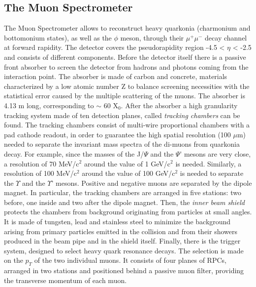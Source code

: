 \subsection*{The Muon Spectrometer}
The Muon Spectrometer allows to reconstruct heavy quarkonia (charmonium and bottomonium states), as well as the $\phi$ meson, through their $\mu^+\mu^-$ decay channel at forward rapidity. The detector covers the pseudorapidity region -4.5 < $\eta$ < -2.5 and consists of different components. Before the detector itself there is a passive front absorber to screen the detector from hadrons and photons coming from the interaction point. The absorber is made of carbon and concrete, materials characterized by a low atomic number Z to balance screening necessities with the statistical error caused by the multiple scattering of the muons. The absorber is 4.13 m long, corresponding to  $\sim$ 60 X$_0$. After the absorber a high granularity tracking system made of ten detection planes, called \textit{tracking chambers} can be found. The tracking chambers consist of multi-wire proportional chambers with a pad cathode readout, in order to guarantee the high spatial resolution (100 $\mu$m) needed to separate the invariant mass spectra of the di-muons from quarkonia decay. For example, since the masses of the J/$\Psi$ and the $\Psi$' mesons are very close, a resolution of 70 MeV/c$^2$ around the value of 1 GeV/c$^2$ is needed. Similarly, a resolution of 100 MeV/c$^2$ around the value of 100 GeV/c$^2$ is needed to separate the $\Upsilon$ and the $\Upsilon$' mesons. Positive and negative muons are separated by the dipole magnet. In particular, the tracking chambers are arranged in five stations: two before, one inside and two after the dipole magnet. Then, the \textit{inner beam shield} protects the chambers from background originating from particles at small angles. It is made of tungsten, lead and stainless steel to minimize the background arising from primary particles emitted in the collision and from their showers produced in the beam pipe and in the shield itself. Finally, there is the trigger system, designed to select heavy quark resonance decays. The selection is made on the $p_T$ of the two individual muons. It consists of four planes of RPCs, arranged in two stations and positioned behind a passive muon filter, providing the transverse momentum of each muon.

